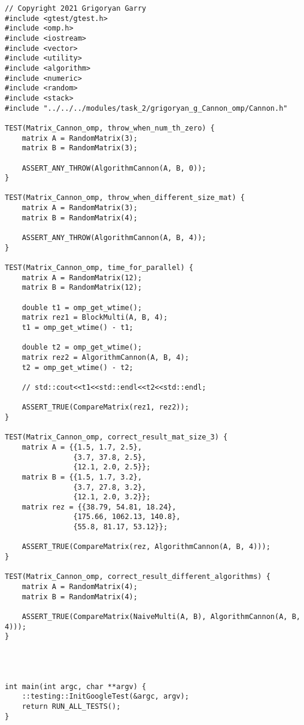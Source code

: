 \documentclass{report}
\begin{document}
\begin{lstlisting}
// Copyright 2021 Grigoryan Garry
#include <gtest/gtest.h>
#include <omp.h>
#include <iostream>
#include <vector>
#include <utility>
#include <algorithm>
#include <numeric>
#include <random>
#include <stack>
#include "../../../modules/task_2/grigoryan_g_Cannon_omp/Cannon.h"

TEST(Matrix_Cannon_omp, throw_when_num_th_zero) {
    matrix A = RandomMatrix(3);
    matrix B = RandomMatrix(3);

    ASSERT_ANY_THROW(AlgorithmCannon(A, B, 0));
}

TEST(Matrix_Cannon_omp, throw_when_different_size_mat) {
    matrix A = RandomMatrix(3);
    matrix B = RandomMatrix(4);

    ASSERT_ANY_THROW(AlgorithmCannon(A, B, 4));
}

TEST(Matrix_Cannon_omp, time_for_parallel) {
    matrix A = RandomMatrix(12);
    matrix B = RandomMatrix(12);

    double t1 = omp_get_wtime();
    matrix rez1 = BlockMulti(A, B, 4);
    t1 = omp_get_wtime() - t1;

    double t2 = omp_get_wtime();
    matrix rez2 = AlgorithmCannon(A, B, 4);
    t2 = omp_get_wtime() - t2;

    // std::cout<<t1<<std::endl<<t2<<std::endl;

    ASSERT_TRUE(CompareMatrix(rez1, rez2));
}

TEST(Matrix_Cannon_omp, correct_result_mat_size_3) {
    matrix A = {{1.5, 1.7, 2.5},
                {3.7, 37.8, 2.5},
                {12.1, 2.0, 2.5}};
    matrix B = {{1.5, 1.7, 3.2},
                {3.7, 27.8, 3.2},
                {12.1, 2.0, 3.2}};
    matrix rez = {{38.79, 54.81, 18.24},
                {175.66, 1062.13, 140.8},
                {55.8, 81.17, 53.12}};

    ASSERT_TRUE(CompareMatrix(rez, AlgorithmCannon(A, B, 4)));
}

TEST(Matrix_Cannon_omp, correct_result_different_algorithms) {
    matrix A = RandomMatrix(4);
    matrix B = RandomMatrix(4);

    ASSERT_TRUE(CompareMatrix(NaiveMulti(A, B), AlgorithmCannon(A, B, 4)));
}




int main(int argc, char **argv) {
    ::testing::InitGoogleTest(&argc, argv);
    return RUN_ALL_TESTS();
}

\end{lstlisting}
\end{document}
